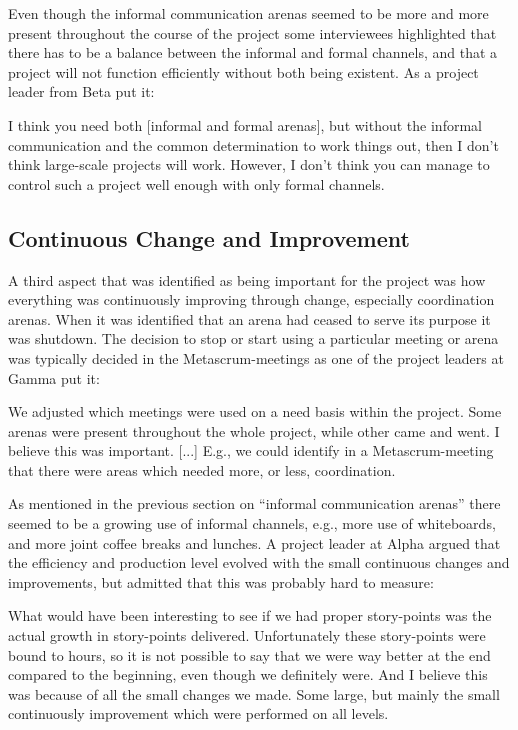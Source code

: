 Even though the informal communication arenas seemed to be more and more present throughout the course of the project some interviewees highlighted that there has to be a balance between the informal and formal channels, and that a project will not function efficiently without both being existent. As a project leader from Beta put it:

\begin{fancyquotes}
I think you need both [informal and formal arenas], but without the informal communication and the common determination to work things out, then I don't think large-scale projects will work. However, I don't think you can manage to control such a project well enough with only formal channels.
\end{fancyquotes}

\subsection{Continuous Change and Improvement}

A third aspect that was identified as being important for the project was how everything was continuously improving through change, especially coordination arenas. When it was identified that an arena had ceased to serve its purpose it was shutdown. The decision to stop or start using a particular meeting or arena was typically decided in the Metascrum-meetings as one of the project leaders at Gamma put it:

\begin{fancyquotes}
We adjusted which meetings were used on a need basis within the project. Some arenas were present throughout the whole project, while other came and went. I believe this was important. [...] E.g., we could identify in a Metascrum-meeting that there were areas which needed more, or less, coordination.
\end{fancyquotes}

As mentioned in the previous section on ``informal communication arenas'' there seemed to be a growing use of informal channels, e.g., more use of whiteboards, and more joint coffee breaks and lunches. A project leader at Alpha argued that the efficiency and production level evolved with the small continuous changes and improvements, but admitted that this was probably hard to measure:

\begin{fancyquotes}
What would have been interesting to see if we had proper story-points was the actual growth in story-points delivered. Unfortunately these story-points were bound to hours, so it is not possible to say that we were way better at the end compared to the beginning, even though we definitely were. And I believe this was because of all the small changes we made. Some large, but mainly the small continuously improvement which were performed on all levels.
\end{fancyquotes}

